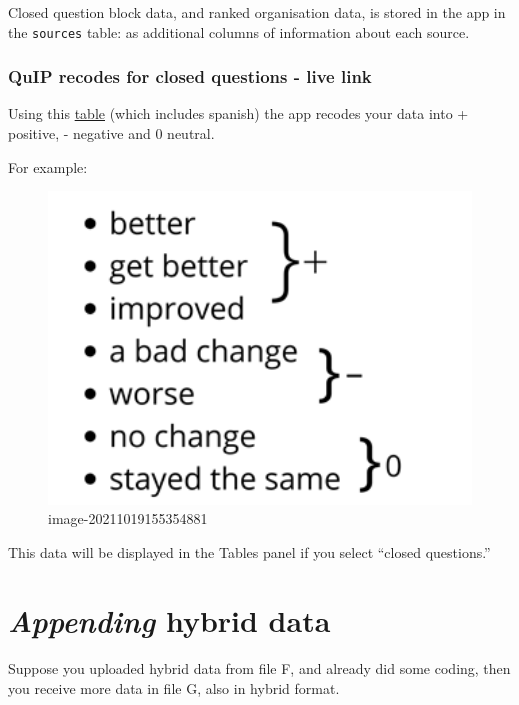\documentclass[
]{book}
\begin{document}
Closed question block data, and ranked organisation data, is stored in the app in the \texttt{sources} table: as additional columns of information about each source.

\hypertarget{quip-recodes-for-closed-questions---live-link}{%
\subsubsection{QuIP recodes for closed questions - live link}\label{quip-recodes-for-closed-questions---live-link}}

Using this \href{https://www.dropbox.com/s/spiacrl67lqwvc9/quip-recodes.xlsx?dl=0}{table} (which includes spanish) the app recodes your data into + positive, - negative and 0 neutral.

For example:

\begin{figure}
\centering
\includegraphics[width=6.77083in,height=\textheight]{_assets/image-20211019155354881.png}
\caption{image-20211019155354881}
\end{figure}

This data will be displayed in the Tables panel if you select ``closed questions.''

\hypertarget{appending-hybrid-data}{%
\section{\texorpdfstring{\emph{Appending} hybrid data}{Appending hybrid data}}\label{appending-hybrid-data}}

Suppose you uploaded hybrid data from file F, and already did some coding, then you receive more data in file G, also in hybrid format.
\end{document}
